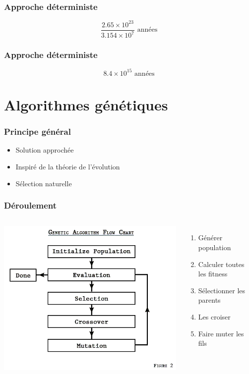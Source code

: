 \documentclass[16pt]{beamer}
\begin{document}
\begin{frame}
  \frametitle{Approche déterministe}
  \[
  \frac{2.65 \times 10^{23}}{3.154 \times 10^{7}} \text{ années}
  \]

\end{frame}

\begin{frame}
  \frametitle{Approche déterministe}
  \[
  8.4 \times 10^{15} \text{ années}
  \]
\end{frame}

\section{Algorithmes génétiques}

\begin{frame}
  \frametitle{Principe général}
  \begin{itemize}
    \item Solution approchée
    \item Inspiré de la théorie de l'évolution
    \item Sélection naturelle
  \end{itemize}
\end{frame}

\begin{frame}
  \frametitle{Déroulement}
  \begin{columns}
        \centering
            \includegraphics[scale=0.4]{GA.png}
        \begin{enumerate}
            \item Générer population \pause{}
            \item Calculer toutes les fitness \pause{}
            \item Sélectionner les parents \pause{}
            \item Les croiser \pause{}
            \item Faire muter les fils
        \end{enumerate}
  \end{columns}
\end{frame}
\end{document}
